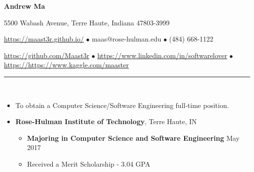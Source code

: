 \documentclass[10pt]{article} %
\begin{document}
\centerline{\LARGE \textbf{Andrew Ma}}  %
\noindent %
\centerline {5500 Wabash Avenue, Terre Haute, Indiana 47803-3999}
\centerline{ \url{https://maast3r.github.io/} $\bullet$ maas@rose-hulman.edu $\bullet$ (484) 668-1122}
\centerline{\url{https://github.com/Maast3r} $\bullet$ \url{https://www.linkedin.com/in/softwarelover} $\bullet$ \url{https://https://www.kaggle.com/maaster}}

\noindent\rule{16.5cm}{0.4pt} %
\\  %
\begin{itemize}
	\item[] To obtain a Computer Science/Software Engineering full-time position.
\end{itemize}
\normalsize \begin{itemize}
	\item[] \normalsize \textbf{Rose-Hulman Institute of Technology}, Terre Haute, IN
	\begin{itemize}
		\item \normalsize \textbf{Majoring in Computer Science and Software Engineering} \hfill May 2017
		\item \normalsize Received a Merit Scholarship - 3.04 GPA
	\end{itemize}
\end{itemize}
\end{document}

